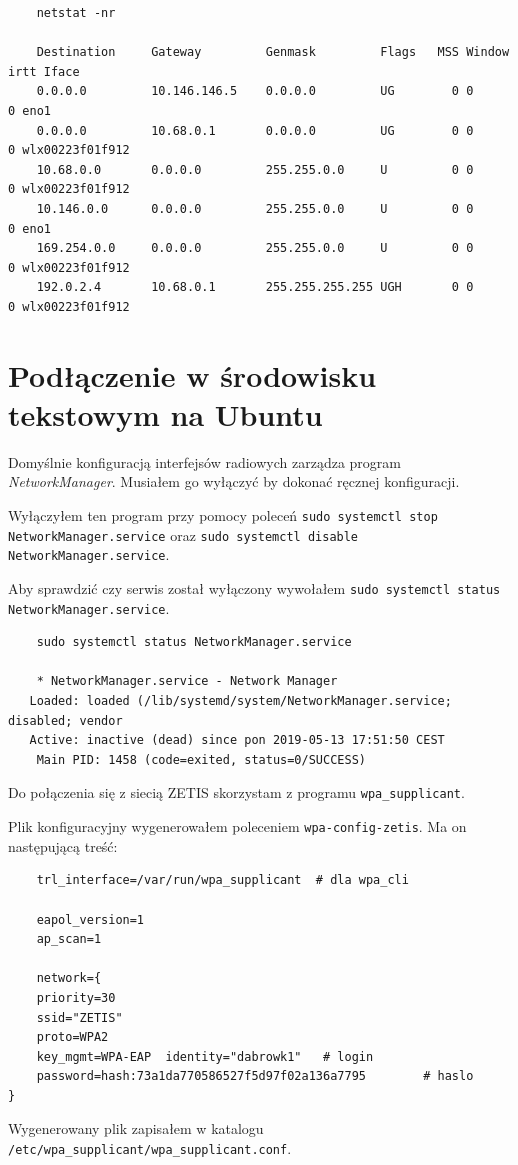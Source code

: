 \documentclass{mwart} %
\begin{document}
\footnotesize{}
\begin{verbatim}
    netstat -nr

    Destination     Gateway         Genmask         Flags   MSS Window  irtt Iface
    0.0.0.0         10.146.146.5    0.0.0.0         UG        0 0          0 eno1
    0.0.0.0         10.68.0.1       0.0.0.0         UG        0 0          0 wlx00223f01f912
    10.68.0.0       0.0.0.0         255.255.0.0     U         0 0          0 wlx00223f01f912
    10.146.0.0      0.0.0.0         255.255.0.0     U         0 0          0 eno1
    169.254.0.0     0.0.0.0         255.255.0.0     U         0 0          0 wlx00223f01f912
    192.0.2.4       10.68.0.1       255.255.255.255 UGH       0 0          0 wlx00223f01f912
\end{verbatim}
\normalsize{}

\section{Podłączenie w środowisku tekstowym na Ubuntu}
Domyślnie konfiguracją interfejsów radiowych zarządza program \textit{NetworkManager}. Musiałem go wyłączyć by dokonać ręcznej konfiguracji.

Wyłączyłem ten program przy pomocy poleceń \texttt{sudo systemctl stop NetworkManager.service} oraz \texttt{sudo systemctl disable NetworkManager.service}.

Aby sprawdzić czy serwis został wyłączony wywołałem \texttt{sudo systemctl status NetworkManager.service}.
\begin{verbatim}
    sudo systemctl status NetworkManager.service

    * NetworkManager.service - Network Manager
   Loaded: loaded (/lib/systemd/system/NetworkManager.service; disabled; vendor
   Active: inactive (dead) since pon 2019-05-13 17:51:50 CEST
    Main PID: 1458 (code=exited, status=0/SUCCESS)
\end{verbatim}
\vspace{5 mm}

Do połączenia się z siecią ZETIS skorzystam z programu \texttt{wpa\_supplicant}.

Plik konfiguracyjny wygenerowałem poleceniem \texttt{wpa-config-zetis}. Ma on następującą treść:
\begin{verbatim}
    trl_interface=/var/run/wpa_supplicant  # dla wpa_cli

    eapol_version=1
    ap_scan=1

    network={
    priority=30
    ssid="ZETIS"
    proto=WPA2
    key_mgmt=WPA-EAP  identity="dabrowk1"   # login
    password=hash:73a1da770586527f5d97f02a136a7795        # haslo 
}
\end{verbatim}
Wygenerowany plik zapisałem w katalogu \texttt{/etc/wpa\_supplicant/wpa\_supplicant.conf}.
\end{document}
